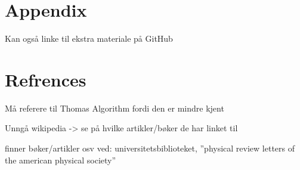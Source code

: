 \documentclass{article}
\begin{document}
\vspace{1cm}

\section{Appendix}

  Kan også linke til ekstra materiale på GitHub





\vspace{1cm}

\section{Refrences}

  Må referere til Thomas Algorithm fordi den er mindre kjent

  Unngå wikipedia -> se på hvilke artikler/bøker de har linket til

  finner bøker/artikler osv ved: universitetsbiblioteket, ''physical review letters of the american physical society''




\end{document}
